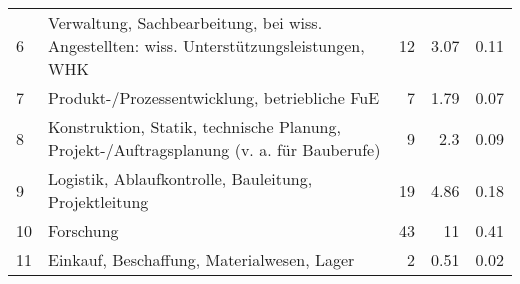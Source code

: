 \begin{longtable}{lXrrr}
     6 &
     \multicolumn{1}{X}{ Verwaltung, Sachbearbeitung, bei wiss. Angestellten: wiss. Unterstützungsleistungen, WHK   } &


       \num{12} &
       \num[round-mode=places,round-precision=2]{3.07} &
         \num[round-mode=places,round-precision=2]{0.11} \\

     7 &
     \multicolumn{1}{X}{ Produkt-/Prozessentwicklung, betriebliche FuE   } &


       \num{7} &
       \num[round-mode=places,round-precision=2]{1.79} &
         \num[round-mode=places,round-precision=2]{0.07} \\

     8 &
     \multicolumn{1}{X}{ Konstruktion, Statik, technische Planung, Projekt-/Auftragsplanung (v. a. für Bauberufe)   } &


       \num{9} &
       \num[round-mode=places,round-precision=2]{2.3} &
         \num[round-mode=places,round-precision=2]{0.09} \\

     9 &
     \multicolumn{1}{X}{ Logistik, Ablaufkontrolle, Bauleitung, Projektleitung   } &


       \num{19} &
       \num[round-mode=places,round-precision=2]{4.86} &
         \num[round-mode=places,round-precision=2]{0.18} \\

     10 &
     \multicolumn{1}{X}{ Forschung   } &


       \num{43} &
       \num[round-mode=places,round-precision=2]{11} &
         \num[round-mode=places,round-precision=2]{0.41} \\

     11 &
     \multicolumn{1}{X}{ Einkauf, Beschaffung, Materialwesen, Lager   } &


       \num{2} &
       \num[round-mode=places,round-precision=2]{0.51} &
         \num[round-mode=places,round-precision=2]{0.02} \\


\end{longtable}

